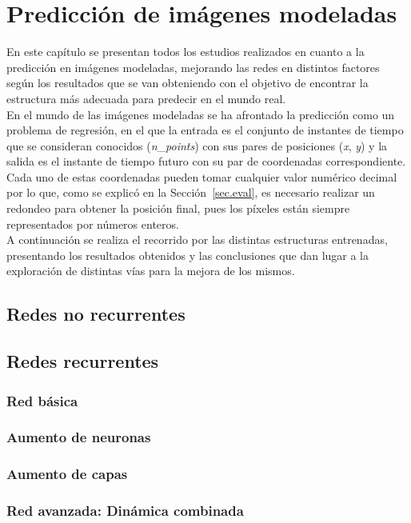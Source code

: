 \chapter{Predicción de imágenes modeladas}\label{cap.redes3dmod}

En este capítulo se presentan todos los estudios realizados en cuanto a la predicción en imágenes modeladas, mejorando las redes en distintos factores según los resultados que se van obteniendo con el objetivo de encontrar la estructura más adecuada para predecir en el mundo real.\\

En el mundo de las imágenes modeladas se ha afrontado la predicción como un problema de regresión, en el que la entrada es el conjunto de instantes de tiempo que se consideran conocidos (\textit{n}\_\textit{points}) con sus pares de posiciones (\textit{x}, \textit{y}) y la salida es el instante de tiempo futuro con su par de coordenadas correspondiente. Cada uno de estas coordenadas pueden tomar cualquier valor numérico decimal por lo que, como se explicó en la Sección~\ref{sec.eval}, es necesario realizar un redondeo para obtener la posición final, pues los píxeles están siempre representados por números enteros.\\

A continuación se realiza el recorrido por las distintas estructuras entrenadas, presentando los resultados obtenidos y las conclusiones que dan lugar a la exploración de distintas vías para la mejora de los mismos.

\section{Redes no recurrentes}

\section{Redes recurrentes}
\subsection{Red básica}
\subsection{Aumento de neuronas}
\subsection{Aumento de capas}
\subsection{Red avanzada: Dinámica combinada}
